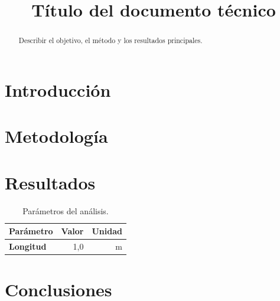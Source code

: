 \documentclass[a4paper,11pt,onecolumn]{article}
\title{Título del documento técnico}
\author{}
\date{}
\numberwithin{equation}{section}
\begin{document}
\renewcommand{\tablename}{Tabla} %
\maketitle
\thispagestyle{fancy}
\begin{abstract}
Describir el objetivo, el método y los resultados principales.
\end{abstract}

\section{Introducción}
\section{Metodología}
\section{Resultados}

\begin{table}[htbp]
  \centering
  \caption{Parámetros del análisis.}
  \label{tab:parametros}
  \begin{tabular}{lrr}
    \toprule
    \rowcolor{CabeceraTabla}
    \textbf{Parámetro} & \textbf{Valor} & \textbf{Unidad} \\
    \midrule
    \cellcolor{ColumnaParametros}\textbf{Longitud} & 1,0 & m \\
    \bottomrule
  \end{tabular}
\end{table}

\section{Conclusiones}
\end{document}
